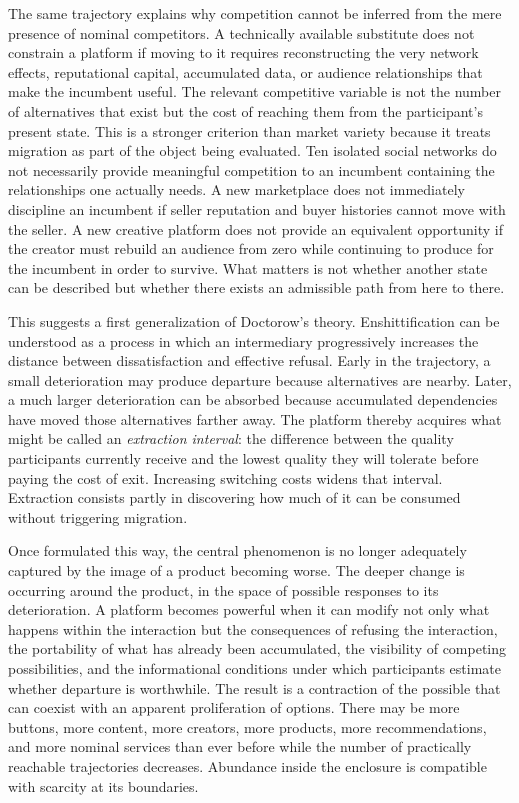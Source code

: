 \documentclass[11pt]{article}
\begin{document}
The same trajectory explains why competition cannot be inferred from the mere presence of nominal competitors. A technically available substitute does not constrain a platform if moving to it requires reconstructing the very network effects, reputational capital, accumulated data, or audience relationships that make the incumbent useful. The relevant competitive variable is not the number of alternatives that exist but the cost of reaching them from the participant's present state. This is a stronger criterion than market variety because it treats migration as part of the object being evaluated. Ten isolated social networks do not necessarily provide meaningful competition to an incumbent containing the relationships one actually needs. A new marketplace does not immediately discipline an incumbent if seller reputation and buyer histories cannot move with the seller. A new creative platform does not provide an equivalent opportunity if the creator must rebuild an audience from zero while continuing to produce for the incumbent in order to survive. What matters is not whether another state can be described but whether there exists an admissible path from here to there.

This suggests a first generalization of Doctorow's theory. Enshittification can be understood as a process in which an intermediary progressively increases the distance between dissatisfaction and effective refusal. Early in the trajectory, a small deterioration may produce departure because alternatives are nearby. Later, a much larger deterioration can be absorbed because accumulated dependencies have moved those alternatives farther away. The platform thereby acquires what might be called an \emph{extraction interval}: the difference between the quality participants currently receive and the lowest quality they will tolerate before paying the cost of exit. Increasing switching costs widens that interval. Extraction consists partly in discovering how much of it can be consumed without triggering migration.

Once formulated this way, the central phenomenon is no longer adequately captured by the image of a product becoming worse. The deeper change is occurring around the product, in the space of possible responses to its deterioration. A platform becomes powerful when it can modify not only what happens within the interaction but the consequences of refusing the interaction, the portability of what has already been accumulated, the visibility of competing possibilities, and the informational conditions under which participants estimate whether departure is worthwhile. The result is a contraction of the possible that can coexist with an apparent proliferation of options. There may be more buttons, more content, more creators, more products, more recommendations, and more nominal services than ever before while the number of practically reachable trajectories decreases. Abundance inside the enclosure is compatible with scarcity at its boundaries.
\end{document}
